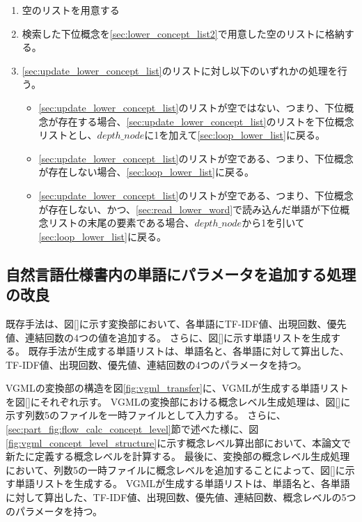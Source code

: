 \begin{enumerate}
\begin{enumerate}
\begin{enumerate}
                    \item 空のリストを用意する
                    \label{sec:lower_concept_list2}
                    \item 検索した下位概念を\ref{sec:lower_concept_list2}で用意した空のリストに格納する。
                    \label{sec:update_lower_concept_list}
                    \item \ref{sec:update_lower_concept_list}のリストに対し以下のいずれかの処理を行う。
                    \begin{itemize}
                        \item \ref{sec:update_lower_concept_list}のリストが空ではない、つまり、下位概念が存在する場合、\ref{sec:update_lower_concept_list}のリストを下位概念リストとし、$depth\_node$に1を加えて\ref{sec:loop_lower_list}に戻る。
                        \item \ref{sec:update_lower_concept_list}のリストが空である、つまり、下位概念が存在しない場合、\ref{sec:loop_lower_list}に戻る。
                        \item \ref{sec:update_lower_concept_list}のリストが空である、つまり、下位概念が存在しない、かつ、\ref{sec:read_lower_word}で読み込んだ単語が下位概念リストの末尾の要素である場合、$depth\_node$から1を引いて\ref{sec:loop_lower_list}に戻る。
                    \end{itemize}
                \end{enumerate}
        \end{enumerate}
\end{enumerate}

\subsection{自然言語仕様書内の単語にパラメータを追加する処理の改良}
\label{sec:improve_word_list}
既存手法は、図\ref{}に示す変換部において、各単語にTF-IDF値、出現回数、優先値、連結回数の4つの値を追加する。
さらに、図\ref{}に示す単語リストを生成する。
既存手法が生成する単語リストは、単語名と、各単語に対して算出した、TF-IDF値、出現回数、優先値、連結回数の4つのパラメータを持つ。

VGMLの変換部の構造を図\ref{fig:vgml_transfer}に、VGMLが生成する単語リストを図\ref{}にそれぞれ示す。
VGMLの変換部における概念レベル生成処理は、図\ref{}に示す列数5のファイルを一時ファイルとして入力する。
さらに、\ref{sec:part_fig:flow_calc_concept_level}節で述べた様に、図\ref{fig:vgml_concept_level_structure}に示す概念レベル算出部において、本論文で新たに定義する概念レベルを計算する。
最後に、変換部の概念レベル生成処理において、列数5の一時ファイルに概念レベルを追加することによって、図\ref{}に示す単語リストを生成する。
VGMLが生成する単語リストは、単語名と、各単語に対して算出した、TF-IDF値、出現回数、優先値、連結回数、概念レベルの5つのパラメータを持つ。

